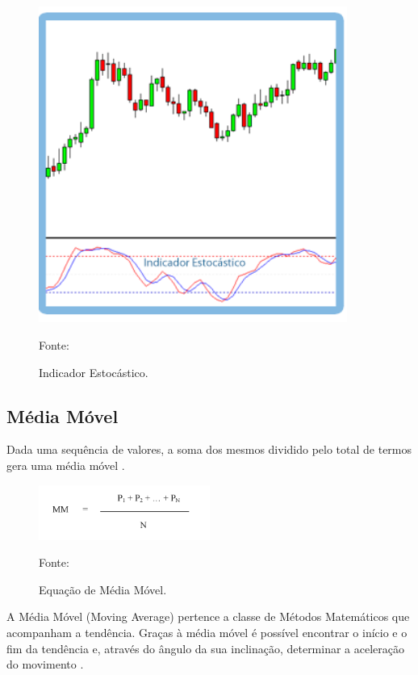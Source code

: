 \begin{figure}[htp]
\centering
\includegraphics[width=0.9\textwidth]{figuras/estocastico}
\caption{Indicador Estocástico.}{Fonte: } 
\label{estocastico}
\end{figure}

\subsection{Média Móvel}

Dada uma sequência de valores, a soma dos mesmos dividido pelo total de termos gera uma média móvel \cite{wolfram}.

\begin{figure}[htp]
\centering
\includegraphics[width=0.5\textwidth]{figuras/equacaoMedia}
\caption{Equação de Média Móvel.}{Fonte: } 
\label{equacaoMedia}
\end{figure}

A Média Móvel (Moving Average) pertence a classe de Métodos Matemáticos que acompanham a tendência. Graças à média móvel é possível encontrar o início e o fim da tendência e, através do ângulo da sua inclinação, determinar a aceleração do movimento \cite{roboforex}.

